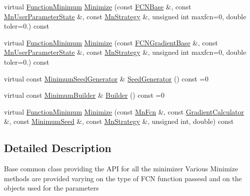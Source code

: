 \begin{DoxyCompactItemize}
\item 
virtual \mbox{\hyperlink{classROOT_1_1Minuit2_1_1FunctionMinimum}{Function\+Minimum}} \mbox{\hyperlink{classROOT_1_1Minuit2_1_1ModularFunctionMinimizer_ad001dbb0a2d17022eb0818b4eddc2af9}{Minimize}} (const \mbox{\hyperlink{classROOT_1_1Minuit2_1_1FCNBase}{F\+C\+N\+Base}} \&, const \mbox{\hyperlink{classROOT_1_1Minuit2_1_1MnUserParameterState}{Mn\+User\+Parameter\+State}} \&, const \mbox{\hyperlink{classROOT_1_1Minuit2_1_1MnStrategy}{Mn\+Strategy}} \&, unsigned int maxfcn=0, double toler=0.) const
\item 
virtual \mbox{\hyperlink{classROOT_1_1Minuit2_1_1FunctionMinimum}{Function\+Minimum}} \mbox{\hyperlink{classROOT_1_1Minuit2_1_1ModularFunctionMinimizer_a695166fd33368026170d6e2224cb2b7a}{Minimize}} (const \mbox{\hyperlink{classROOT_1_1Minuit2_1_1FCNGradientBase}{F\+C\+N\+Gradient\+Base}} \&, const \mbox{\hyperlink{classROOT_1_1Minuit2_1_1MnUserParameterState}{Mn\+User\+Parameter\+State}} \&, const \mbox{\hyperlink{classROOT_1_1Minuit2_1_1MnStrategy}{Mn\+Strategy}} \&, unsigned int maxfcn=0, double toler=0.) const
\item 
virtual const \mbox{\hyperlink{classROOT_1_1Minuit2_1_1MinimumSeedGenerator}{Minimum\+Seed\+Generator}} \& \mbox{\hyperlink{classROOT_1_1Minuit2_1_1ModularFunctionMinimizer_a742930de97b0ce9ba23773874ae0894b}{Seed\+Generator}} () const =0
\item 
virtual const \mbox{\hyperlink{classROOT_1_1Minuit2_1_1MinimumBuilder}{Minimum\+Builder}} \& \mbox{\hyperlink{classROOT_1_1Minuit2_1_1ModularFunctionMinimizer_a13e98551cf14e927c61e1e34ecf8ba8b}{Builder}} () const =0
\item 
virtual \mbox{\hyperlink{classROOT_1_1Minuit2_1_1FunctionMinimum}{Function\+Minimum}} \mbox{\hyperlink{classROOT_1_1Minuit2_1_1ModularFunctionMinimizer_ad4852ac93fa43f2328b9857acc602296}{Minimize}} (const \mbox{\hyperlink{classROOT_1_1Minuit2_1_1MnFcn}{Mn\+Fcn}} \&, const \mbox{\hyperlink{classROOT_1_1Minuit2_1_1GradientCalculator}{Gradient\+Calculator}} \&, const \mbox{\hyperlink{classROOT_1_1Minuit2_1_1MinimumSeed}{Minimum\+Seed}} \&, const \mbox{\hyperlink{classROOT_1_1Minuit2_1_1MnStrategy}{Mn\+Strategy}} \&, unsigned int, double) const
\end{DoxyCompactItemize}


\subsection{Detailed Description}
Base common class providing the A\+PI for all the minimizer Various Minimize methods are provided varying on the type of F\+CN function passesd and on the objects used for the parameters 

